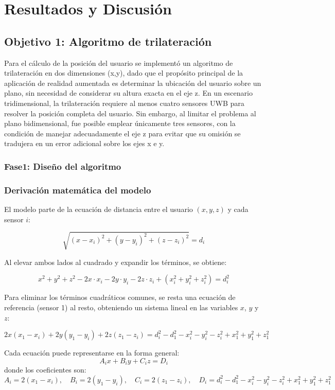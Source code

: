 \section{Resultados y Discusión}
\subsection{Objetivo 1: Algoritmo de trilateración}

Para el cálculo de la posición del usuario se implementó un algoritmo de trilateración en dos dimensiones (x,y), dado que el propósito principal de la aplicación de realidad aumentada es determinar la ubicación del usuario sobre un plano, sin necesidad de considerar su altura exacta en el eje z. En un escenario tridimensional, la trilateración requiere al menos cuatro sensores UWB para resolver la posición completa del usuario. Sin embargo, al limitar el problema al plano bidimensional, fue posible emplear únicamente tres sensores, con la condición de manejar adecuadamente el eje z para evitar que su omisión se tradujera en un error adicional sobre los ejes x e y.

\subsubsection{Fase1: Diseño del algoritmo}
\subsubsection*{Derivación matemática del modelo}

El modelo parte de la ecuación de distancia entre el usuario $(x, y, z)$ y cada sensor $i$:

\[
\sqrt{(x-x_i)^2 + (y-y_i)^2 + (z-z_i)^2} = d_i
\]

Al elevar ambos lados al cuadrado y expandir los términos, se obtiene:

\[
x^2 + y^2 + z^2 - 2x \cdot x_i - 2y \cdot y_i - 2z \cdot z_i + (x_i^2 + y_i^2 + z_i^2) = d_i^2
\]

Para eliminar los términos cuadráticos comunes, se resta una ecuación de referencia (sensor 1) al resto, obteniendo un sistema lineal en las variables $x$, $y$ y $z$:

\[
2x(x_1 - x_i) + 2y(y_1 - y_i) + 2z(z_1 - z_i) = d_i^2 - d_1^2 - x_i^2 - y_i^2 - z_i^2 + x_1^2 + y_1^2 + z_1^2
\]

Cada ecuación puede representarse en la forma general:
\[
A_i x + B_i y + C_i z = D_i
\]
donde los coeficientes son:
\[
A_i = 2(x_1 - x_i), \quad
B_i = 2(y_1 - y_i), \quad
C_i = 2(z_1 - z_i), \quad
D_i = d_i^2 - d_1^2 - x_i^2 - y_i^2 - z_i^2 + x_1^2 + y_1^2 + z_1^2
\]

